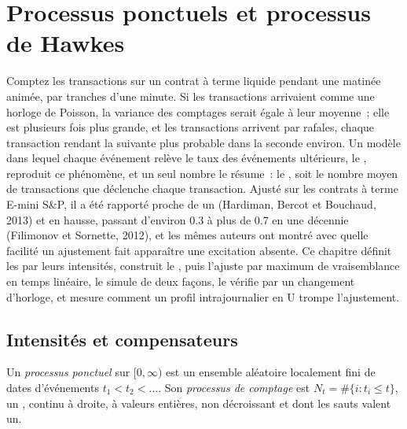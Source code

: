 \chapter{Processus ponctuels et processus de Hawkes}\label{ch:qm:point-processes-and-hawkes-processes}

Comptez les transactions sur un contrat à terme liquide pendant une matinée animée, par tranches d'une minute. Si les transactions
arrivaient comme une horloge de Poisson, la variance des comptages serait égale à leur moyenne~; elle est plusieurs
fois plus grande, et les transactions arrivent par rafales, chaque transaction rendant la suivante plus probable dans
la seconde environ. Un modèle dans lequel chaque événement relève le taux des événements ultérieurs, le
, reproduit ce phénomène, et un seul nombre le résume~: le , soit le nombre moyen
de transactions que déclenche chaque transaction. Ajusté sur les contrats à terme E-mini S\&P, il a été rapporté proche de
un (Hardiman, Bercot et Bouchaud, 2013) et en hausse, passant d'environ 0.3 à plus de 0.7 en une décennie (Filimonov et
Sornette, 2012), et les mêmes auteurs ont montré avec quelle facilité un ajustement fait apparaître une excitation
absente. Ce chapitre définit les  par leurs intensités, construit le , puis
l'ajuste par maximum de vraisemblance en temps linéaire, le simule de deux façons, le vérifie par un changement d'horloge, et
mesure comment un profil intrajournalier en U trompe l'ajustement.

\section{Intensités et compensateurs}

\begin{definition}\label{def:qm:point-processes-and-hawkes-processes:pp}
Un \emph{processus ponctuel} sur $[0, \infty)$ est un ensemble aléatoire localement fini de dates
d'événements $t_1 < t_2 < \dots$. Son \emph{processus de comptage} est $N_t = \#\{i : t_i \le t\}$,
un , continu à droite, à valeurs entières, non décroissant et dont les sauts valent un.
\end{definition}

